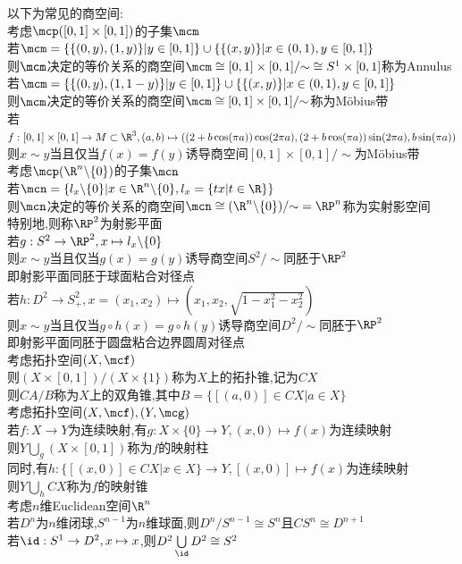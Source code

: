 \begin{zhu}
以下为常见的商空间:\\
考虑$\mcp([0,1]\times[0,1])$的子集$\mcm$\\
若$\mcm=\{\{(0,y),(1,y)\}|y\in [0,1]\}\cup\{\{(x,y)\}|x\in(0,1),y\in [0,1]\}$\\
则$\mcm$决定的等价关系的商空间$\mcm\cong [0,1]\times[0,1]/{\sim}\cong S^{1}\times [0,1]$称为Annulus\\
若$\mcm=\{\{(0,y),(1,1-y)\}|y\in [0,1]\}\cup\{\{(x,y)\}|x\in(0,1),y\in [0,1]\}$\\
则$\mcm$决定的等价关系的商空间$\mcm\cong [0,1]\times[0,1]/{\sim}$称为Möbius带\\
若$f:[0,1]\times[0,1]\to M\subset \R^3,(a,b)\mapsto ((2+b\cos(\pi a))\cos(2\pi a),(2+b\cos(\pi a))\sin(2\pi a),b\sin(\pi a))$\\
则$x\sim y$当且仅当$f(x)=f(y)$诱导商空间$[0,1]\times[0,1]/{\sim}$为Möbius带\\
考虑$\mcp(\R^n\backslash\{0\})$的子集$\mcn$\\
若$\mcn=\{l_{x}\backslash \{0\}|x\in\R^n\backslash\{0\},l_{x}=\{tx|t\in\R\}\}$\\
则$\mcn$决定的等价关系的商空间$\mcn\cong (\R^n\backslash\{0\})/{\sim}=\RP^n$称为实射影空间\\
特别地,则称$\RP^2$为射影平面\\
若$g:S^2\to\RP^2,x\mapsto l_x\backslash\{0\}$\\
则$x\sim y$当且仅当$g(x)=g(y)$诱导商空间$S^2/{\sim}$同胚于$\RP^2$\\
即射影平面同胚于球面粘合对径点\\
若$h:D^2\to S^2_{+},x=(x_1,x_2)\mapsto (x_1,x_2,\sqrt{1-x_1^2-x_2^2})$\\
则$x\sim y$当且仅当$g\circ h(x)=g\circ h(y)$诱导商空间$D^2/{\sim}$同胚于$\RP^2$\\
即射影平面同胚于圆盘粘合边界圆周对径点\\
考虑拓扑空间$(X,\mcf)$\\
则$(X\times[0,1])/(X\times\{1\})$称为$X$上的拓扑锥,记为$CX$\\
则$CA/B$称为$X$上的双角锥,其中$B=\{[(a,0)]\in CX|a\in X\}$\\
考虑拓扑空间$(X,\mcf),(Y,\mcg)$\\
若$f:X\to Y$为连续映射,有$g:X\times\{0\}\to Y,(x,0)\mapsto f(x)$为连续映射\\
则$Y\bigcup\limits_{g}(X\times [0,1])$称为$f$的映射柱\\
同时,有$h:\{[(x,0)]\in CX|x\in X\}\to Y,[(x,0)]\mapsto f(x)$为连续映射\\
则$Y\bigcup\limits_{h}CX$称为$f$的映射锥\\
考虑$n$维Euclidean空间$\R^n$\\
若$D^n$为$n$维闭球,$S^{n-1}$为$n$维球面,则$D^n/S^{n-1}\cong S^n$且$CS^n\cong D^{n+1}$\\
若$\id:S^1\to D^2,x\mapsto x$,则$D^2\bigcup\limits_{\id}D^2\cong S^2$
\end{zhu}

